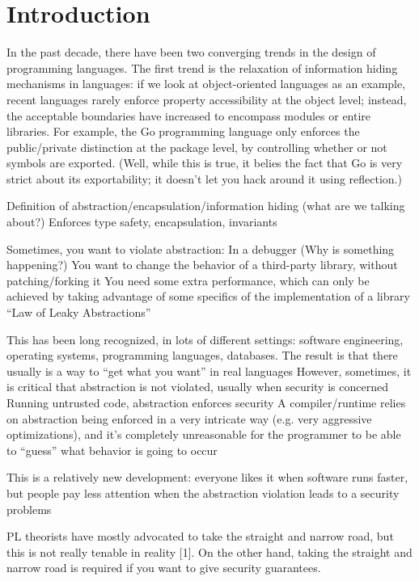 \section{Introduction}\label{sec:intro}

In the past decade, there have been two converging trends in the design
of programming languages. The first trend is the relaxation of
information hiding mechanisms in languages: if we look at
object-oriented languages as an example, recent languages rarely enforce
property accessibility at the object level; instead, the acceptable
boundaries have increased to encompass modules or entire libraries. For
example, the Go programming language only enforces the public/private
distinction at the   package level, by controlling whether or not
symbols are exported. (Well, while this is true, it belies the fact that
Go is very strict about its exportability; it doesn't let you hack
around it using reflection.)

Definition of abstraction/encapsulation/information hiding (what are we talking about?)
	Enforces type safety, encapsulation, invariants

Sometimes, you want to violate abstraction:
	In a debugger (Why is something happening?)
	You want to change the behavior of a third-party library, without patching/forking it
	You need some extra performance, which can only be achieved by taking advantage of some specifics of the implementation of a library
	``Law of Leaky Abstractions''

This has been long recognized, in lots of different settings: software engineering, operating systems, programming languages, databases. The result is that there usually is a way to ``get what you want'' in real languages
However, sometimes, it is critical that abstraction is not violated, usually when security is concerned
	Running untrusted code, abstraction enforces security
	A compiler/runtime relies on abstraction being enforced in a very intricate way (e.g. very aggressive optimizations), and it's completely unreasonable for the programmer to be able to “guess” what behavior is going to occur

This is a relatively new development: everyone likes it when software runs faster, but people pay less attention when the abstraction violation leads to a security problems

PL theorists have mostly advocated to take the straight and narrow road, but this is not really tenable in reality [1]. On the other hand, taking the straight and narrow road is required if you want to give security guarantees.

